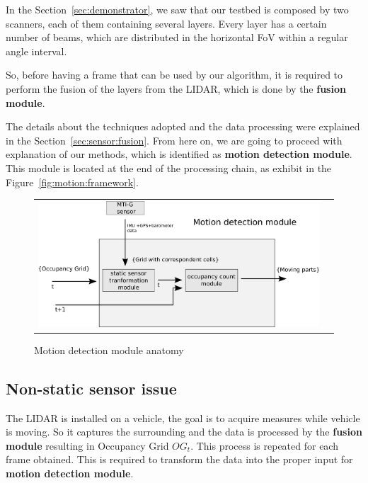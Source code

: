 In the Section~\ref{sec:demonstrator}, we saw that our testbed is composed by two scanners, each of them containing several layers. Every layer has a certain number of beams, which are distributed in the horizontal FoV within a regular angle interval. 

So, before having a frame that can be used by our algorithm, it is required to perform the fusion of the layers from the LIDAR, which is done by the \textbf{fusion module}. 

The details about the techniques adopted and the data processing were explained in the Section~\ref{sec:sensor:fusion}. From here on, we are going to proceed with explanation of our methods, which is identified as \textbf{motion detection module}. This module is located at the end of the processing chain, as exhibit in the Figure~\ref{fig:motion:framework}. 

\begin{figure}[h]
   \centering
     \begin{tabular}{lr}
       \includegraphics[scale=0.50]{img/fig:motion:framework:motionmodule}
     \end{tabular}
   \caption{Motion detection module anatomy}
   \label{fig:motion:framework:motionmodule}
\end{figure}


\subsection{Non-static sensor issue}

The LIDAR is installed on a vehicle, the goal is to acquire measures while vehicle is moving. So it captures the surrounding and the data is processed by the \textbf{fusion module} resulting in Occupancy Grid $OG_t$. This process is repeated for each frame obtained. This is required to transform the data into the proper input for \textbf{motion detection module}.

